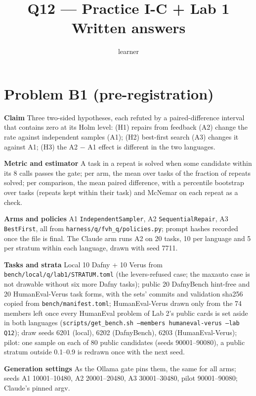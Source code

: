 \documentclass[11pt]{article}
\title{Q12 --- Practice I-C + Lab 1 \\ \large Written answers}
\author{learner}
\date{}
\begin{document}
\maketitle
\sloppy

\section*{Problem B1 (pre-registration)}\label{ans:B1}
\begin{answer}
\textbf{Claim} Three two-sided hypotheses, each refuted by a paired-difference interval
that contains zero at its Holm level: (H1) repairs from feedback (A2) change the rate
against independent samples (A1); (H2) best-first search (A3) changes it against A1;
(H3) the A2 $-$ A1 effect is different in the two languages.

\textbf{Metric and estimator} A task in a repeat is solved when some candidate within
its 8 calls passes the gate; per arm, the mean over tasks of the fraction of repeats
solved; per comparison, the mean paired difference, with a percentile bootstrap over
tasks (repeats kept within their task) and McNemar on each repeat as a check.

\textbf{Arms and policies} A1 \texttt{IndependentSampler}, A2 \texttt{SequentialRepair},
A3 \texttt{BestFirst}, all from \texttt{harness/q/fvh\_q/policies.py}; prompt hashes
recorded once the file is final. The Claude arm runs A2 on 20 tasks, 10 per language
and 5 per stratum within each language, drawn with seed 7711.

\textbf{Tasks and strata} Local 10 Dafny + 10 Verus from
\texttt{bench/local/q/lab1/STRATUM.toml} (the levers-refused case; the maxauto case is
not drawable without six more Dafny tasks); public 20 DafnyBench hint-free and 20
HumanEval-Verus task forms, with the sets' commits and validation sha256 copied from
\texttt{bench/manifest.toml}; HumanEval-Verus drawn only from the 74 members left once
every HumanEval problem of Lab 2's public cards is set aside in both languages
(\texttt{scripts/get\_bench.sh --members humaneval-verus --lab Q12}); draw seeds 6201 (local), 6202 (DafnyBench), 6203 (HumanEval-Verus); pilot: one sample on each of 80 public
candidates (seeds 90001--90080), a public stratum outside 0.1--0.9 is redrawn once with
the next seed.

\textbf{Generation settings} As the Ollama gate pins them, the same for all arms;
seeds A1 10001--10480, A2 20001--20480, A3 30001--30480, pilot 90001--90080; Claude's
pinned argv.


\end{answer}
\end{document}
